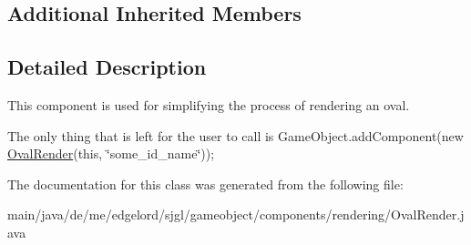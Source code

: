 \subsection*{Additional Inherited Members}


\subsection{Detailed Description}
This component is used for simplifying the process of rendering an oval. 

The only thing that is left for the user to call is {\ttfamily Game\+Object.\+add\+Component(new \mbox{\hyperlink{classde_1_1me_1_1edgelord_1_1sjgl_1_1gameobject_1_1components_1_1rendering_1_1_oval_render}{Oval\+Render}}(this, \char`\"{}some\+\_\+id\+\_\+name\char`\"{}));} 

The documentation for this class was generated from the following file\+:\begin{DoxyCompactItemize}
\item 
main/java/de/me/edgelord/sjgl/gameobject/components/rendering/Oval\+Render.\+java\end{DoxyCompactItemize}
